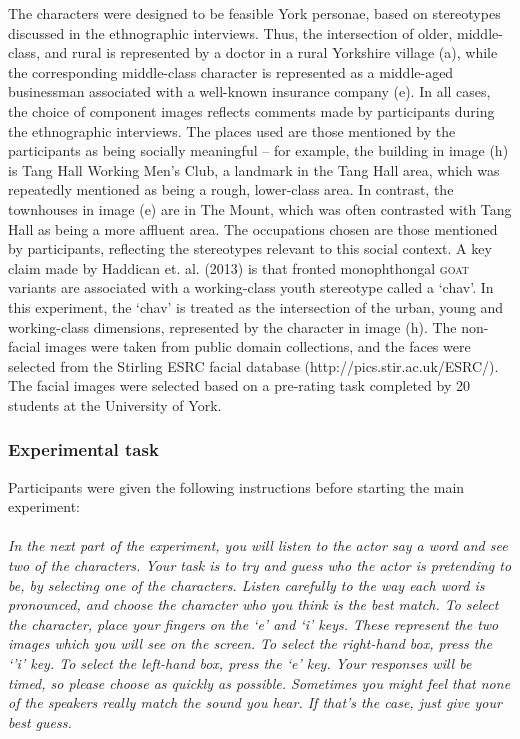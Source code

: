 \documentclass[PWPL]{article}
\begin{document}
The characters were designed to be feasible York personae, based on stereotypes discussed in the ethnographic interviews. Thus, the intersection of older, middle-class, and rural is represented by a doctor in a rural Yorkshire village (a), while the corresponding middle-class character is represented as a middle-aged businessman associated with a well-known insurance company (e). In all cases, the choice of component images reflects comments made by participants during the ethnographic interviews. The places used are those mentioned by the participants as being socially meaningful -- for example, the building in image (h) is Tang Hall Working Men's Club, a landmark in the Tang Hall area, which was repeatedly mentioned as being a rough, lower-class area. In contrast, the townhouses in image (e) are in The Mount, which was often contrasted with Tang Hall as being a more affluent area. The occupations chosen are those mentioned by participants, reflecting the stereotypes relevant to this social context. A key claim made by Haddican et. al. (2013) is that fronted monophthongal \textsc{goat} variants are associated with a working-class youth stereotype called a `chav'. In this experiment, the `chav' is treated as the intersection of the urban, young and working-class dimensions, represented by the character in image (h). The non-facial images were taken from public domain collections, and the faces were selected from the Stirling ESRC facial database (http://pics.stir.ac.uk/ESRC/). The facial images were selected based on a pre-rating task completed by 20 students at the University of York. 
\subsubsection{Experimental task}

Participants were given the following instructions before starting the main experiment:\\\\
\textit{In the next part of the experiment, you will listen to the actor say a word and see two of the characters. Your task is to try and guess who the actor is pretending to be, by selecting one of the characters. Listen carefully to the way each word is pronounced, and choose the character who you think is the best match. To select the character, place your fingers on the `e' and `i' keys. These represent the two images which you will see on the screen. To select the right-hand box, press the `'i' key. To select the left-hand box, press the `e' key. Your responses will be timed, so please choose as quickly as possible. Sometimes you might feel that none of the speakers really match the sound you hear. If that's the case, just give your best guess.}\\
\end{document}
